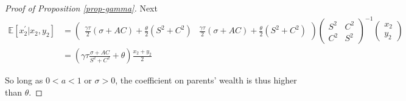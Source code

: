 \documentclass[
  12pt,
]{article}
\theoremstyle{definition}
\theoremstyle{definition}
\theoremstyle{definition}
\theoremstyle{definition}
\theoremstyle{remark}
\begin{document}
\begin{proof}[Proof of Proposition \ref{prop-gamma}]
Next
\begin{align*}
\mathbb{E}[x_{2}^{\prime}|x_{2},y_{2}] & =\left(\begin{array}{cc}
\frac{\gamma\tau}{2}(\sigma+AC)+\frac{\theta}{2}(S^{2}+C^{2}) & \frac{\gamma\tau}{2}(\sigma+AC)+\frac{\theta}{2}(S^{2}+C^{2})\end{array}\right)\left(\begin{array}{cc}
S^{2} & C^{2}\\
C^{2} & S^{2}
\end{array}\right)^{-1}\left(\begin{array}{c}
x_{2}\\
y_{2}
\end{array}\right)\\
 & =\left(\gamma\tau\frac{\sigma+AC}{S^{2}+C^{2}}+\theta\right)\frac{x_{2}+y_{2}}{2}
\end{align*}

So long as $0<a<1$ or $\sigma>0$, the coefficient on parents' wealth is thus 
higher than $\theta$.

\end{proof}
\end{document}
